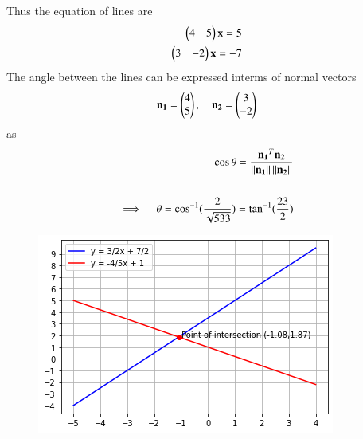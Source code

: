 \documentclass[journal,12pt,twocolumn]{IEEEtran}
\begin{document}
Thus the equation of lines are
\begin{align}
	\begin{pmatrix}4 & 5\end{pmatrix}\mathbf{x} = 5 \\
	\begin{pmatrix}3 & -2\end{pmatrix}\mathbf{x} = -7 
\end{align}
The angle between the lines can be expressed interms of normal vectors 
\begin{align}
	\mathbf{n_1}=\begin{pmatrix}4\\5\end{pmatrix} , \quad \mathbf{n_2}=\begin{pmatrix}3\\-2\end{pmatrix}
\end{align}
as
\begin{align}
	\cos\theta=\frac{\mathbf{n_1}^T\mathbf{n_2}}{\left\lVert\mathbf{n_1}\right\rVert\left\lVert\mathbf{n_2}\right\rVert} \\
				\nonumber \\
	\implies \quad \theta=\cos^{-1}({\frac{2}{\sqrt{533}}}) = \tan^{-1}(\frac{23}{2})
\end{align}
\begin{figure}[!h]
	\includegraphics[width=\columnwidth]{lines.png}
	\caption{} \label{linefig1}
\end{figure}
\end{document}
